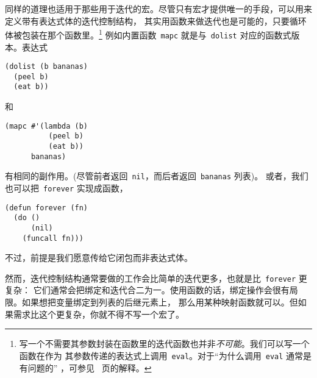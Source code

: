 同样的道理也适用于那些用于迭代的宏。尽管只有宏才提供唯一的手段，可以用来定义带有表达式体的迭代控制结构，
其实用函数来做迭代也是可能的，只要循环体被包装在那个函数里。\footnote{
写一个不需要其参数封装在函数里的迭代函数也并非\emph{不可能}。我们可以写一个函数在作为
其参数传递的表达式上调用~\texttt{eval}。对于“为什么调用~\texttt{eval} 通常是有问题的”
，可参见~\pageref{bad-eval} 页的解释。}%
例如内置函数~\texttt{mapc} 就是与~\texttt{dolist} 对应的函数式版本。表达式
\begin{lstlisting}
(dolist (b bananas)
  (peel b)
  (eat b))
\end{lstlisting}
和
\begin{lstlisting}
(mapc #'(lambda (b)
          (peel b)
          (eat b))
      bananas)
\end{lstlisting}
有相同的副作用。(尽管前者返回~\verb|nil|，而后者返回~\verb|bananas| 列表)。
或者，我们也可以把~\verb|forever| 实现成函数，
\begin{lstlisting}
(defun forever (fn)
  (do ()
      (nil)
    (funcall fn)))
\end{lstlisting}
不过，前提是我们愿意传给它闭包而非表达式体。

然而，迭代控制结构通常要做的工作会比简单的迭代更多，也就是比~\verb|forever| 更复杂：
它们通常会把绑定和迭代合二为一。使用函数的话，绑定操作会很有局限。如果想把变量绑定到列表的后继元素上，
那么用某种映射函数就可以。但如果需求比这个更复杂，你就不得不写一个宏了。

